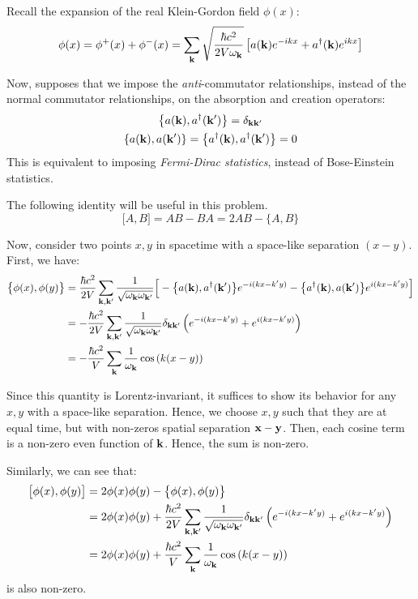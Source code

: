 \documentclass[letterpaper,12pt]{article}
\newenvironment{problem}{\subsection{}\begin{adjustwidth}{0.25in}{}\vspace{-\baselineskip}}{\end{adjustwidth}}
\begin{document}
\begin{problem}
Recall the expansion of the real Klein-Gordon field $\phi(x)$:
\begin{equation*}
	\phi(x) = \phi^+(x) + \phi^-(x) = \sum_{\vb{k}} \sqrt{\frac{\hbar c^2}{2V\omega_{\vb{k}}}} \left[a(\vb{k})e^{-ikx} + a^\dagger(\vb{k})e^{ikx}\right]
\end{equation*}

Now, supposes that we impose the \emph{anti}-commutator relationships, instead of the normal commutator relationships, on the absorption and creation operators:
\begin{gather*}
	\left\{a(\vb{k}), a^\dagger(\vb{k}')\right\} = \delta_{\vb{k}\vb{k}'}	\\
	\left\{a(\vb{k}), a(\vb{k}') \right\} = \left\{a^\dagger(\vb{k}), a^\dagger(\vb{k}') \right\} = 0
\end{gather*}
This is equivalent to imposing \emph{Fermi-Dirac statistics}, instead of Bose-Einstein statistics.

The following identity will be useful in this problem.
\begin{equation*}
	\big[A, B\big] = AB - BA = 2AB - \big\{A, B\}
\end{equation*}

Now, consider two points $x,y$ in spacetime with a space-like separation $(x-y)$. First, we have:
\begin{align*}
	\big\{\phi(x), \phi(y)\big\}
	&= \frac{\hbar c^2}{2V}\sum_{\vb{k},\vb{k}'} \frac{1}{\sqrt{\omega_{\vb{k}}\omega_{\vb{k}'}}}
	\Big[-\big\{a(\vb{k}), a^\dagger(\vb{k}')\big\}e^{-i(kx-k'y)} - \big\{a^\dagger(\vb{k}), a(\vb{k}')\big\}e^{i(kx-k'y)}\Big]	\\
	&= -\frac{\hbar c^2}{2V} \sum_{\vb{k},\vb{k}'} \frac{1}{\sqrt{\omega_{\vb{k}}\omega_{\vb{k}'}}} \delta_{\vb{k}\vb{k}'}\left(e^{-i(kx-k'y)} + e^{i(kx-k'y)}\right)	\\
	&= -\frac{\hbar c^2}{V} \sum_{\vb{k}} \frac{1}{\omega_{\vb{k}}} \cos\left(k(x-y)\right)
\end{align*}

Since this quantity is Lorentz-invariant, it suffices to show its behavior for any $x,y$ with a space-like separation. Hence, we choose $x,y$ such that they are at equal time, but with non-zeros spatial separation $\vb{x}-\vb{y}$. Then, each cosine term is a non-zero even function of $\vb{k}$. Hence, the sum is non-zero.

Similarly, we can see that:
\begin{align*}
	\big[\phi(x), \phi(y)\big]
	&= 2\phi(x)\phi(y) - \big\{\phi(x), \phi(y)\big\}	\\
	&= 2\phi(x)\phi(y) + \frac{\hbar c^2}{2V} \sum_{\vb{k},\vb{k}'} \frac{1}{\sqrt{\omega_{\vb{k}}\omega_{\vb{k}'}}} \delta_{\vb{k}\vb{k}'}\left(e^{-i(kx-k'y)} + e^{i(kx-k'y)}\right)		\\
	&= 2\phi(x)\phi(y) + \frac{\hbar c^2}{V} \sum_{\vb{k}} \frac{1}{\omega_{\vb{k}}} \cos\left(k(x-y)\right)
\end{align*}
is also non-zero.


\end{problem}
\end{document}
